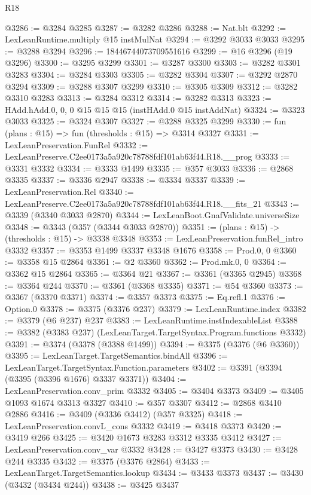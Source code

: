 \begin{lexlean}{R18}
\begin{coremodule}
{{{{{{{{{{{{{{{{{{{@3286 := @3284 @3285
@3287 := @3282 @3286
@3288 := Nat.blt
@3292 := LexLeanRuntime.multiply @15 instMulNat
@3294 := @3292 @3033 @3033
@3295 := @3288 @3294
@3296 := 18446744073709551616
@3299 := @16 @3296 (@19 @3296)
@3300 := @3295 @3299
@3301 := @3287 @3300
@3303 := @3282 @3301 @3283
@3304 := @3284 @3303
@3305 := @3282 @3304
@3307 := @3292 @2870 @3294
@3309 := @3288 @3307 @3299
@3310 := @3305 @3309
@3312 := @3282 @3310 @3283
@3313 := @3284 @3312
@3314 := @3282 @3313
@3323 := HAdd.hAdd.{0, 0, 0} @15 @15 @15 (instHAdd.{0} @15 instAddNat)
@3324 := @3323 @3033
@3325 := @3324 @3307
@3327 := @3288 @3325 @3299
@3330 := fun (plans : @15) => fun (thresholds : @15) => @3314 @3327
@3331 := LexLeanPreservation.FunRel
@3332 := LexLeanPreserve.C2ee0173a5a920c78788fdf101ab63f44.R18.__prog
@3333 := @3331 @3332
@3334 := @3333 @1499
@3335 := @357 @3033
@3336 := @2868 @3335
@3337 := @3336 @2947
@3338 := @3334 @3337
@3339 := LexLeanPreservation.Rel
@3340 := LexLeanPreserve.C2ee0173a5a920c78788fdf101ab63f44.R18.__fits_21
@3343 := @3339 (@3340 @3033 @2870)
@3344 := LexLeanBoot.GnafValidate.universeSize
@3348 := @3343 (@357 (@3344 @3033 @2870))
@3351 := (plans : @15) -> (thresholds : @15) -> @3338 @3348
@3353 := LexLeanPreservation.funRel_intro @3332
@3357 := @3353 @1499 @3337 @3348 @1676
@3358 := Prod.{0, 0}
@3360 := @3358 @15 @2864
@3361 := @2 @3360
@3362 := Prod.mk.{0, 0}
@3364 := @3362 @15 @2864
@3365 := @3364 @21
@3367 := @3361 (@3365 @2945)
@3368 := @3364 @244
@3370 := @3361 (@3368 @3335)
@3371 := @54 @3360
@3373 := @3367 (@3370 @3371)
@3374 := @3357 @3373
@3375 := Eq.refl.{1}
@3376 := Option.{0}
@3378 := @3375 (@3376 @237)
@3379 := LexLeanRuntime.index
@3382 := @3379 (@6 @237) @237
@3383 := LexLeanRuntime.instIndexableList
@3388 := @3382 (@3383 @237) (LexLeanTarget.TargetSyntax.Program.functions @3332)
@3391 := @3374 (@3378 (@3388 @1499))
@3394 := @3375 (@3376 (@6 @3360))
@3395 := LexLeanTarget.TargetSemantics.bindAll
@3396 := LexLeanTarget.TargetSyntax.Function.parameters
@3402 := @3391 (@3394 (@3395 (@3396 @1676) @3337 @3371))
@3404 := LexLeanPreservation.conv_prim @3332
@3405 := @3404 @3373
@3409 := @3405 @1093 @1674 @3313 @3327
@3410 := @357 @3307
@3412 := @2868 @3410 @2886
@3416 := @3409 (@3336 @3412) (@357 @3325)
@3418 := LexLeanPreservation.convL_cons @3332
@3419 := @3418 @3373
@3420 := @3419 @266
@3425 := @3420 @1673 @3283 @3312 @3335 @3412
@3427 := LexLeanPreservation.conv_var @3332
@3428 := @3427 @3373
@3430 := @3428 @244 @3335
@3432 := @3375 (@3376 @2864)
@3433 := LexLeanTarget.TargetSemantics.lookup
@3434 := @3433 @3373
@3437 := @3430 (@3432 (@3434 @244))
@3438 := @3425 @3437
}}}}}}}}}}}}}}}}}}}
\end{coremodule}
\end{lexlean}
